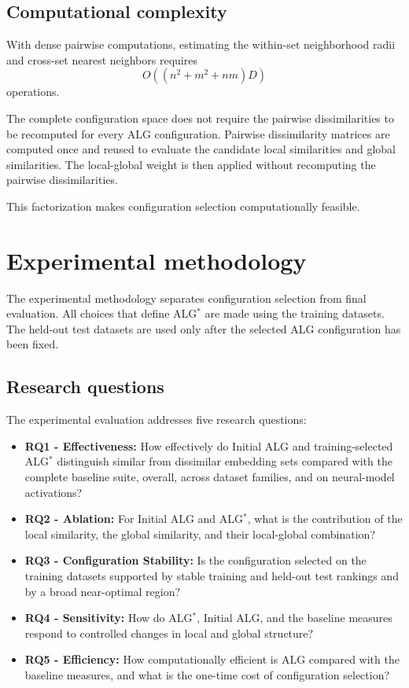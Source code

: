 \documentclass[preprint,12pt]{elsarticle}
\begin{document}
\subsection{Computational complexity}

With dense pairwise computations, estimating the within-set neighborhood
radii and cross-set nearest neighbors requires
\[
O\!\left((n^2+m^2+nm)D\right)
\]
operations.

The complete configuration space does not require the pairwise
dissimilarities to be recomputed for every ALG configuration. Pairwise
dissimilarity matrices are computed once and reused to evaluate the candidate
local similarities and global similarities. The local-global weight is then
applied without recomputing the pairwise dissimilarities.

This factorization makes configuration selection computationally feasible.

\section{Experimental methodology}
\label{sec:protocol}

The experimental methodology separates configuration selection from final
evaluation. All choices that define ALG$^*$ are made using the training
datasets. The held-out test datasets are used only after the selected ALG
configuration has been fixed.

\subsection{Research questions}

The experimental evaluation addresses five research questions:

\begin{itemize}
    \item \textbf{RQ1 - Effectiveness:} How effectively do Initial ALG and
    training-selected ALG$^*$ distinguish similar from dissimilar embedding
    sets compared with the complete baseline suite, overall, across dataset
    families, and on neural-model activations?

    \item \textbf{RQ2 - Ablation:} For Initial ALG and ALG$^*$, what is the
    contribution of the local similarity, the global similarity, and their
    local-global combination?

    \item \textbf{RQ3 - Configuration Stability:} Is the configuration selected
    on the training datasets supported by stable training and held-out test
    rankings and by a broad near-optimal region?

    \item \textbf{RQ4 - Sensitivity:} How do ALG$^*$, Initial ALG, and the
    baseline measures respond to controlled changes in local and global
    structure?

    \item \textbf{RQ5 - Efficiency:} How computationally efficient is ALG
    compared with the baseline measures, and what is the one-time cost of
    configuration selection?
\end{itemize}
\end{document}
